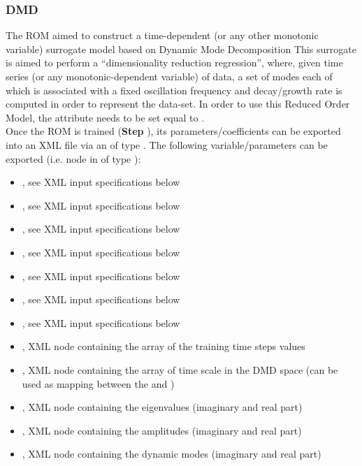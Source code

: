 \subsubsection{DMD}
  The  ROM aimed to construct a time-dependent (or any other
  monotonic     variable) surrogate model based on Dynamic Mode Decomposition     This surrogate is
  aimed to perform a ``dimensionality reduction regression'', where, given time     series (or any
  monotonic-dependent variable) of data, a set of modes each of which is associated     with a fixed
  oscillation frequency and decay/growth rate is computed     in order to represent the data-set.
  In order to use this Reduced Order Model, the  attribute      needs
  to be set equal to .     \\     Once the ROM  is trained (\textbf{Step}
  ), its parameters/coefficients can be exported into an XML file     via an
   of type . The following variable/parameters can be exported
  (i.e.  node     in  of type ):     \begin{itemize}
  \item {}, see XML input specifications below       \item {},
  see XML input specifications below       \item {}, see XML input specifications below
  \item {}, see XML input specifications below       \item {},
  see XML input specifications below       \item {}, see XML input
  specifications below       \item {}, see XML input specifications below
  \item {}, XML node containing the array of the training time steps values
  \item {}, XML node containing the array of time scale in the DMD space (can be
  used as mapping       between the   and )       \item
  , XML node containing the eigenvalues (imaginary and real part)       \item
  , XML node containing the amplitudes (imaginary and real part)       \item
  , XML node containing the dynamic modes (imaginary and real part)     \end{itemize}

